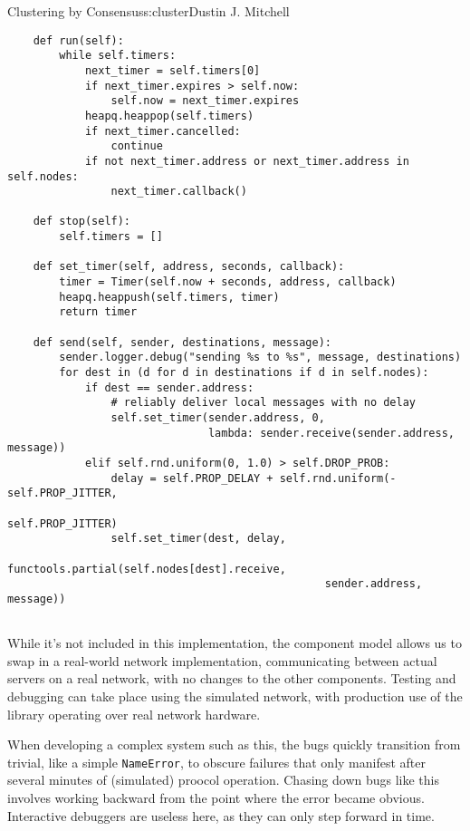 \begin{aosachapter}{Clustering by Consensus}{s:cluster}{Dustin J. Mitchell}
\begin{verbatim}
    def run(self):
        while self.timers:
            next_timer = self.timers[0]
            if next_timer.expires > self.now:
                self.now = next_timer.expires
            heapq.heappop(self.timers)
            if next_timer.cancelled:
                continue
            if not next_timer.address or next_timer.address in self.nodes:
                next_timer.callback()

    def stop(self):
        self.timers = []

    def set_timer(self, address, seconds, callback):
        timer = Timer(self.now + seconds, address, callback)
        heapq.heappush(self.timers, timer)
        return timer

    def send(self, sender, destinations, message):
        sender.logger.debug("sending %s to %s", message, destinations)
        for dest in (d for d in destinations if d in self.nodes):
            if dest == sender.address:
                # reliably deliver local messages with no delay
                self.set_timer(sender.address, 0,  
                               lambda: sender.receive(sender.address, message))
            elif self.rnd.uniform(0, 1.0) > self.DROP_PROB:
                delay = self.PROP_DELAY + self.rnd.uniform(-self.PROP_JITTER, 
                                                           self.PROP_JITTER)
                self.set_timer(dest, delay, 
                               functools.partial(self.nodes[dest].receive, 
                                                 sender.address, message))
    
\end{verbatim}

While it's not included in this implementation, the component model
allows us to swap in a real-world network implementation, communicating
between actual servers on a real network, with no changes to the other
components. Testing and debugging can take place using the simulated
network, with production use of the library operating over real network
hardware.

\label{debugging-support}

When developing a complex system such as this, the bugs quickly
transition from trivial, like a simple \texttt{NameError}, to obscure
failures that only manifest after several minutes of (simulated) proocol
operation. Chasing down bugs like this involves working backward from
the point where the error became obvious. Interactive debuggers are
useless here, as they can only step forward in time.


\end{aosachapter}
